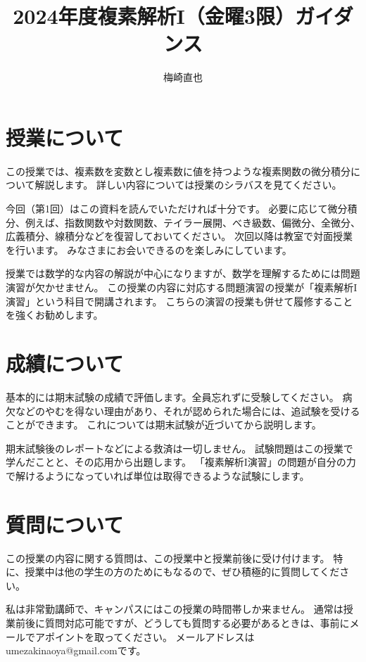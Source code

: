\documentclass{ltjsarticle}
\title{2024年度複素解析I（金曜3限）ガイダンス}
\author{梅崎直也}
\begin{document}
\maketitle

\section*{授業について}

この授業では、複素数を変数とし複素数に値を持つような複素関数の微分積分について解説します。
詳しい内容については授業のシラバスを見てください。

今回（第1回）はこの資料を読んでいただければ十分です。
必要に応じて微分積分、例えば、指数関数や対数関数、テイラー展開、べき級数、偏微分、全微分、広義積分、線積分などを復習しておいてください。
次回以降は教室で対面授業を行います。
みなさまにお会いできるのを楽しみにしています。

授業では数学的な内容の解説が中心になりますが、数学を理解するためには問題演習が欠かせません。
この授業の内容に対応する問題演習の授業が「複素解析I演習」という科目で開講されます。
こちらの演習の授業も併せて履修することを強くお勧めします。

\section*{成績について}

基本的には期末試験の成績で評価します。全員忘れずに受験してください。
病欠などのやむを得ない理由があり、それが認められた場合には、追試験を受けることができます。
これについては期末試験が近づいてから説明します。

期末試験後のレポートなどによる救済は一切しません。
試験問題はこの授業で学んだことと、その応用から出題します。
「複素解析I演習」の問題が自分の力で解けるようになっていれば単位は取得できるような試験にします。

\section*{質問について}

この授業の内容に関する質問は、この授業中と授業前後に受け付けます。
特に、授業中は他の学生の方のためにもなるので、ぜひ積極的に質問してください。

私は非常勤講師で、キャンパスにはこの授業の時間帯しか来ません。
通常は授業前後に質問対応可能ですが、どうしても質問する必要があるときは、事前にメールでアポイントを取ってください。
メールアドレスはumezakinaoya@gmail.comです。
\end{document}

